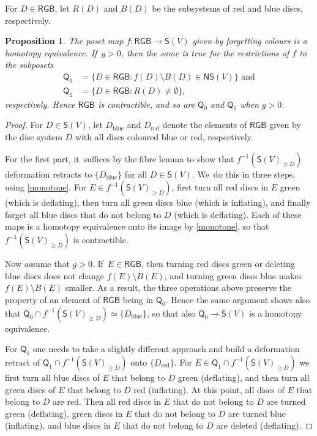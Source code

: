 \documentclass[11pt]{article}
\theoremstyle{plain}
\newtheorem{prop}[thm]{Proposition}
\theoremstyle{definition}
\newcommand{\RGB}{{\mathsf{RGB}}}
\newcommand{\NS}{\mathsf{NS}}
\newcommand{\SD}{\mathsf{S}}
\begin{document}
For $D \in \RGB$, let $R(D)$ and $B(D)$ be the subsystems of red and blue discs, respectively.

\begin{prop}\label{p:colour_forgetting_maps}
The poset map $f: \RGB \to \SD(V)$ given by forgetting colours is a homotopy equivalence. If~$g>0$, then the same is true for the restrictions of $f$ to the subposets
\begin{align*}
{\mathsf Q_0} &= \{D \in \RGB : f(D) \setminus B(D) \in \NS(V) \} \text{ and} \\
{\mathsf Q_1} &= \{D \in \RGB : R(D) \neq \emptyset \},
\end{align*}
respectively. Hence $\RGB$ is contractible, and so are $\mathsf Q_0$ and $\mathsf Q_1$ when $g>0$.
\end{prop}

\begin{proof}For $D \in \SD(V)$, let $D_{\mathrm{blue}}$ and $D_{\mathrm{red}}$ denote the elements of $\RGB$ given by the disc system $D$ with all discs coloured blue or red, respectively.

For the first part, it~suffices by the fibre lemma to show that $f^{-1}(\SD(V)_{\geq D})$ deformation retracts to $\{D_{\mathrm{blue}}\}$ for all $D \in \SD(V)$. We~do this in three steps, using \cref{monotone}. For $E \in f^{-1}(\SD(V)_{\geq D})$, first turn all red discs in $E$ green (which is deflating), then turn all green discs blue (which is inflating), and finally forget all blue discs that do not belong to $D$ (which is deflating). Each of these maps is a homotopy equivalence onto its image by \cref{monotone}, so that $f^{-1}(\SD(V)_{\geq D})$ is contractible.

Now assume that $g>0$. If~$E \in \RGB$, then turning red discs green or deleting blue discs does not change $f(E) \setminus B(E)$, and turning green discs blue makes $f(E) \setminus B(E)$ smaller. As a result, the three operations above preserve the property of an element of $\RGB$ being in $\mathsf Q_0$. Hence the same argument shows also that $\mathsf Q_0 \cap f^{-1}(\SD(V)_{\geq D}) \simeq \{D_{\mathrm{blue}}\}$, so that also $\mathsf Q_0 \to \SD(V)$ is a homotopy equivalence.

For $\mathsf Q_1$ one needs to take a slightly different approach and build a deformation retract of $\mathsf Q_1 \cap f^{-1}(\SD(V)_{\geq D})$ onto $\{D_{\mathrm{red}}\}$. For $E \in \mathsf Q_1 \cap f^{-1}(\SD(V)_{\geq D})$ we first turn all blue discs of $E$ that belong to $ D$ green (deflating), and then turn all green discs of $E$ that belong to $ D$ red (inflating). At this point, all discs of $E$ that belong to $D$ are red. Then all red discs in $E$ that do not belong to $D$ are turned green (deflating), green discs in $E$ that do not belong to $D$ are turned blue (inflating), and blue discs in $E$ that do not belong to $D$ are deleted (deflating). \end{proof}
\end{document}
